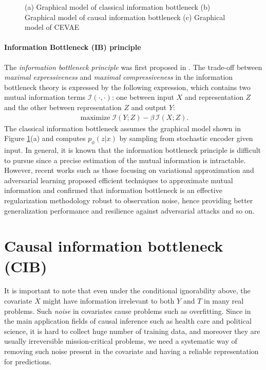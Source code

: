 \documentclass{article}
\DeclareMathOperator*{\maximize}{maximize}
\begin{document}
\begin{figure}[t]
	\centering
 	 \vspace{-.2cm}\caption{(a) Graphical model of classical information bottleneck (b) Graphical model of causal information bottleneck (c) Graphical model of CEVAE~\cite{Louizos17} } 
 	\label{fig:graphical_model}
\end{figure}


\paragraph{Information Bottleneck (IB) principle}    
    The \textit{information bottleneck principle} was first proposed in \cite{Tishby99}. The trade-off between \textit{maximal expressiveness} and \textit{maximal compressiveness} in the information bottleneck theory is expressed by the following expression, which contains two mutual information terms $\mathcal{I}(\cdot, \cdot)$: one between input $X$ and representation $Z$ and the other between representation $Z$ and output $Y$:
  \begin{align*}
      \maximize \mathcal{I}(Y;Z) - \beta \, \mathcal{I}(X;Z).
  \end{align*}
  The classical information bottleneck assumes the graphical model shown in Figure \ref{fig:graphical_model}(a) and computes $p_{\phi}(z|x)$ by sampling from stochastic encoder given input. In general, it is known that the information bottleneck principle is difficult to pursue since a precise estimation of the mutual information is intractable. However, recent works such as those focusing on variational approximation \cite{Alemi17} and adversarial learning \cite{Belghazi18} proposed efficient techniques to approximate mutual information and confirmed that information bottleneck is an effective regularization methodology robust to observation noise, hence providing better generalization performance and resilience against adversarial attacks and so on. 
  
\section{Causal information bottleneck (CIB)}
 It is important to note that even under the conditional ignorability above, the covariate $X$ might have information irrelevant to both $Y$ and $T$ in many real problems. Such \emph{noise} in covariates cause problems such as overfitting. Since in the main application fields of causal inference such as health care and political science, it is hard to collect huge number of training data, and moreover they are usually irreversible mission-critical problems, we need a systematic way of removing such noise present in the covariate and having a reliable representation for predictions.
    
\end{document}
